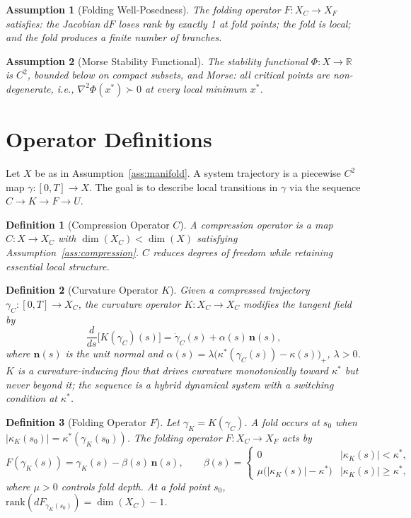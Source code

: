 \documentclass[12pt,a4paper]{article}
\newtheorem{definition}{Definition}[section]
\newtheorem{assumption}{Assumption}[section]
\begin{document}
\begin{assumption}[Folding Well-Posedness]
\label{ass:fold}
The folding operator $F : X_C \to X_F$ satisfies: the Jacobian $dF$
loses rank by exactly 1 at fold points; the fold is local; and the
fold produces a finite number of branches.
\end{assumption}

\begin{assumption}[Morse Stability Functional]
\label{ass:morse}
The stability functional $\Phi : X \to \mathbb{R}$ is $C^2$, bounded
below on compact subsets, and Morse: all critical points are
non-degenerate, i.e., $\nabla^2\Phi(x^*) \succ 0$ at every local
minimum $x^*$.
\end{assumption}

\section{Operator Definitions}
\label{sec:operators}

Let $X$ be as in Assumption~\ref{ass:manifold}.
A system trajectory is a piecewise $C^2$ map
$\gamma : [0,T] \to X$.
The goal is to describe local transitions in $\gamma$ via the sequence
$C \to K \to F \to U$.

\begin{definition}[Compression Operator $C$]
\label{def:C}
A \emph{compression operator} is a map $C : X \to X_C$ with
$\dim(X_C) < \dim(X)$ satisfying Assumption~\ref{ass:compression}.
$C$ reduces degrees of freedom while retaining essential local
structure.
\end{definition}

\begin{definition}[Curvature Operator $K$]
\label{def:K}
Given a compressed trajectory $\gamma_C : [0,T] \to X_C$,
the \emph{curvature operator} $K : X_C \to X_C$ modifies the tangent
field by
\[
  \frac{d}{ds}\bigl[K(\gamma_C)(s)\bigr]
  = \dot\gamma_C(s) + \alpha(s)\,\mathbf{n}(s),
\]
where $\mathbf{n}(s)$ is the unit normal and
$\alpha(s) = \lambda\bigl(\kappa^*(\gamma_C(s)) - \kappa(s)\bigr)_+$,
$\lambda > 0$.
$K$ is a curvature-inducing flow that drives curvature monotonically
toward $\kappa^*$ but never beyond it; the sequence is a hybrid
dynamical system with a switching condition at $\kappa^*$.
\end{definition}

\begin{definition}[Folding Operator $F$]
\label{def:F}
Let $\gamma_K = K(\gamma_C)$.
A fold occurs at $s_0$ when $|\kappa_K(s_0)| = \kappa^*(\gamma_K(s_0))$.
The \emph{folding operator} $F : X_C \to X_F$ acts by
\[
  F(\gamma_K(s)) = \gamma_K(s) - \beta(s)\,\mathbf{n}(s),
  \qquad
  \beta(s) =
  \begin{cases}
    0 & |\kappa_K(s)| < \kappa^*, \\
    \mu\bigl(|\kappa_K(s)| - \kappa^*\bigr) & |\kappa_K(s)| \geq \kappa^*,
  \end{cases}
\]
where $\mu > 0$ controls fold depth.
At a fold point $s_0$, $\mathrm{rank}(dF_{\gamma_K(s_0)}) =
\dim(X_C) - 1$.
\end{definition}
\end{document}
